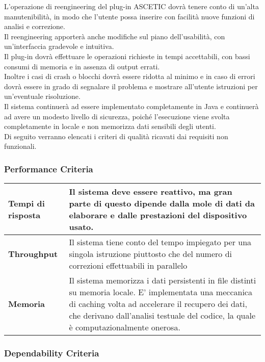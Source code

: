 L'operazione di reengineering del plug-in ASCETIC dovrà tenere conto di un'alta manutenibilità, in modo che l'utente possa inserire con facilità nuove funzioni di analisi e correzione.
\\
Il reengineering apporterà anche modifiche sul piano dell'usabilità, con un'interfaccia gradevole e intuitiva.
\\
Il plug-in dovrà effettuare le operazioni richieste in tempi accettabili, con bassi consumi di memoria e in assenza di output errati.
\\
Inoltre i casi di crash o blocchi dovrà essere ridotta al minimo e in caso di errori dovrà essere in grado di segnalare il problema e mostrare all'utente istruzioni per un'eventuale risoluzione.
\\
Il sistema continuerà ad essere implementato completamente in Java e continuerà ad avere un modesto livello di sicurezza, poiché l’esecuzione viene svolta completamente in locale e non memorizza dati sensibili degli utenti.
\\
Di seguito verranno elencati i criteri di qualità ricavati dai requisiti non funzionali.

\subsubsection{Performance Criteria}

		\begin{tabular}{|p{3cm}|p{13cm}|}
		\hline
		
		\vfill \centering \textbf{Tempi di risposta} \vfill & \vfill Il sistema deve essere reattivo, ma gran parte di questo dipende dalla mole di dati da elaborare e dalle prestazioni del dispositivo usato.\vfill \\ \hline 			
		\vfill \centering \textbf{Throughput} \vfill & \vfill Il sistema tiene conto del tempo impiegato per una singola istruzione piuttosto che del numero di correzioni effettuabili in parallelo\vfill \\
		\hline
		\vfill \centering \textbf{Memoria} \vfill & \vfill Il sistema memorizza i dati persistenti in file distinti su memoria locale. E' implementata una meccanica di caching volta ad accelerare il recupero dei dati, che derivano dall'analisi testuale del codice, la quale è computazionalmente onerosa. \vfill \\
		\hline
		
		\end{tabular}
	
\subsubsection{Dependability Criteria}

